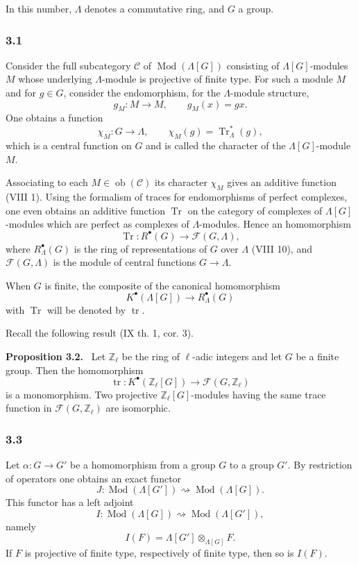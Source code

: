 \documentclass[11pt]{article}
\newenvironment{statement}[1]{\par\medskip\noindent\textbf{#1.}\ }{\par\medskip}
\providecommand{\Tr}{\operatorname{Tr}}
\providecommand{\Tr}{\operatorname{Tr}}
\providecommand{\Ob}{\operatorname{ob}}
\providecommand{\Tr}{\operatorname{Tr}}
\providecommand{\Ob}{\operatorname{ob}}
\providecommand{\Tr}{\operatorname{Tr}}
\providecommand{\Ob}{\operatorname{Ob}}
\providecommand{\Mod}{\operatorname{Mod}}
\providecommand{\tr}{\operatorname{tr}}
\providecommand{\Tr}{\operatorname{Tr}}
\providecommand{\Ob}{\operatorname{ob}}
\providecommand{\Ob}{\operatorname{Ob}}
\begin{document}
In this number, $\Lambda$ denotes a commutative ring, and $G$ a group.

\subsubsection*{3.1}

Consider the full subcategory $\mathcal C$ of $\Mod(\Lambda[G])$ consisting of $\Lambda[G]$-modules $M$ whose underlying $\Lambda$-module is projective of finite type. For such a module $M$ and for $g\in G$, consider the endomorphism, for the $\Lambda$-module structure,
\[
g_M:M\longrightarrow M,
\qquad g_M(x)=gx.
\]
One obtains a function
\[
\chi_M:G\longrightarrow \Lambda,
\qquad \chi_M(g)=\Tr^*_\Lambda(g),
\]
which is a central function on $G$ and is called the character of the $\Lambda[G]$-module $M$.

Associating to each $M\in\Ob(\mathcal C)$ its character $\chi_M$ gives an additive function (VIII 1). Using the formalism of traces for endomorphisms of perfect complexes, one even obtains an additive function $\Tr$ on the category of complexes of $\Lambda[G]$-modules which are perfect as complexes of $\Lambda$-modules. Hence an homomorphism
\[
\Tr:R^{\bullet}(G)\longrightarrow \mathcal F(G,\Lambda),
\]
where $R^{\bullet}_{\Lambda}(G)$ is the ring of representations of $G$ over $\Lambda$ (VIII 10), and $\mathcal F(G,\Lambda)$ is the module of central functions $G\to\Lambda$.

When $G$ is finite, the composite of the canonical homomorphism
\[
K^{\bullet}(\Lambda[G])\longrightarrow R^{\bullet}_{\Lambda}(G)
\]
with $\Tr$ will be denoted by $\tr$.

Recall the following result (IX th. 1, cor. 3).

\begin{statement}{Proposition 3.2}
Let $\mathbb Z_\ell$ be the ring of $\ell$-adic integers and let $G$ be a finite group. Then the homomorphism
\[
\tr:K^{\bullet}(\mathbb Z_\ell[G])\longrightarrow \mathcal F(G,\mathbb Z_\ell)
\]
is a monomorphism. Two projective $\mathbb Z_\ell[G]$-modules having the same trace function in $\mathcal F(G,\mathbb Z_\ell)$ are isomorphic.
\end{statement}

\subsubsection*{3.3}

Let $\alpha:G\to G'$ be a homomorphism from a group $G$ to a group $G'$. By restriction of operators one obtains an exact functor
\[
J:\Mod(\Lambda[G'])\rightsquigarrow\Mod(\Lambda[G]).
\]
This functor has a left adjoint
\[
I:\Mod(\Lambda[G])\rightsquigarrow\Mod(\Lambda[G']),
\]
namely
\[
I(F)=\Lambda[G']\otimes_{\Lambda[G]}F.
\]
If $F$ is projective of finite type, respectively of finite type, then so is $I(F)$.
\end{document}
